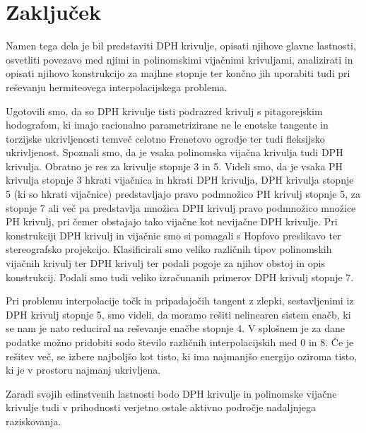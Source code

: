 \documentclass[12pt,a4paper,twoside]{article}
\theoremstyle{definition} %
\theoremstyle{plain} %
\theoremstyle{primerstyle}
\numberwithin{equation}{section}  %
\begin{document}
\section{Zaključek}

Namen tega dela je bil predstaviti DPH krivulje, opisati njihove glavne lastnosti, osvetliti povezavo med njimi in polinomskimi vijačnimi krivuljami, analizirati in opisati njihovo konstrukcijo za majhne stopnje ter končno jih uporabiti tudi pri reševanju hermiteovega interpolacijskega problema.

Ugotovili smo, da so DPH krivulje tisti podrazred krivulj s pitagorejskim hodografom, ki imajo racionalno parametrizirane ne le enotske tangente in torzijske ukrivljenosti temveč celotno Frenetovo ogrodje ter tudi fleksijsko ukrivljenost. Spoznali smo, da je vsaka polinomska vijačna krivulja tudi DPH krivulja. Obratno je res za krivulje stopnje 3 in 5. Videli smo, da je vsaka PH krivulja stopnje 3 hkrati vijačnica in hkrati DPH krivulja, DPH krivulja stopnje 5 (ki so hkrati vijačnice) predstavljajo pravo podmnožico PH krivulj stopnje 5, za stopnje 7 ali več pa predstavlja množica DPH krivulj pravo podmnožico množice PH krivulj, pri čemer obstajajo tako vijačne kot nevijačne DPH krivulje. Pri konstrukciji DPH krivulj in vijačnic smo si pomagali s Hopfovo preslikavo ter stereografsko projekcijo. Klasificirali smo veliko različnih tipov polinomskih vijačnih krivulj ter DPH krivulj ter podali pogoje za njihov obstoj in opis konstrukcij. Podali smo tudi veliko izračunanih primerov DPH krivulj stopnje 7.

Pri problemu interpolacije točk in pripadajočih tangent z zlepki, sestavljenimi iz DPH krivulj stopnje 5, smo videli, da moramo rešiti nelinearen sistem enačb, ki se nam je nato reduciral na reševanje enačbe stopnje 4. V splošnem je za dane podatke možno pridobiti sodo število različnih interpolacijskih med 0 in 8. Če je rešitev več, se izbere najboljšo kot tisto, ki ima najmanjšo energijo oziroma tisto, ki je v prostoru najmanj ukrivljena.

Zaradi svojih edinstvenih lastnosti bodo DPH krivulje in polinomske vijačne krivulje tudi v prihodnosti verjetno ostale aktivno področje nadaljnjega raziskovanja. 
\end{document}
